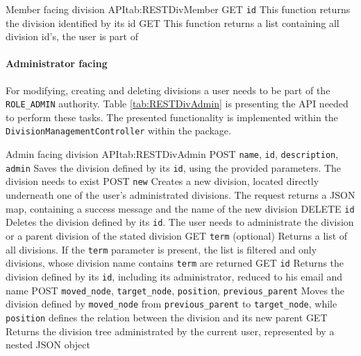 \begin{RESTTable}{Member facing division API}{tab:RESTDivMember}
		{GET}
		{\texttt{id}}
		{This function returns the division identified by its id}
		{GET}
		{}
		{This function returns a list containing all division id's, the user is part of}
\end{RESTTable}

\paragraph{Administrator facing}
For modifying, creating and deleting divisions a user needs to be part of the \texttt{ROLE\_ADMIN} authority. Table \vref{tab:RESTDivAdmin} is presenting the \gls{API} needed to perform these tasks. The presented functionality is implemented within the \texttt{DivisionManagementController} within the  package.

\begin{RESTTable}{Admin facing division API}{tab:RESTDivAdmin}
		{POST}
		{\texttt{name}, \texttt{id}, \texttt{description}, \texttt{admin}}
		{Saves the division defined by its \texttt{id}, using the provided parameters. The division needs to exist}
		{POST} 
		{\texttt{new}}
		{Creates a new division, located directly underneath one of the user's administrated divisions. The request returns a JSON map, containing a success message and the name of the new division}
		{DELETE}
		{\texttt{id}}
		{Deletes the division defined by its \texttt{id}. The user needs to administrate the division or a parent division of the stated division}
		{GET}
		{\texttt{term} (optional)}
		{Returns a list of all divisions. If the \texttt{term} parameter is present, the list is filtered and only divisions, whose division name contains \texttt{term} are returned}
		{GET}
		{\texttt{id}}
		{Returns the division defined by its \texttt{id}, including its administrator, reduced to his email and name}
		{POST}
		{\texttt{moved\_node}, \texttt{target\_node}, \texttt{position}, \texttt{previous\_parent}}
		{Moves the division defined by \texttt{moved\_node} from \texttt{previous\_parent} to \texttt{target\_node}, while \texttt{position} defines the relation between the division and its new parent}
		{GET}
		{} 
		{Returns the division tree administrated by the current user, represented by a nested JSON object}
\end{RESTTable}

